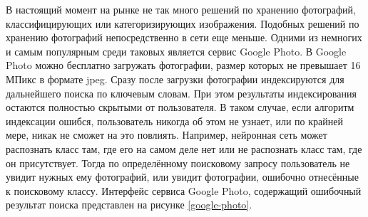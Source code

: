 В настоящий момент на рынке не так много решений по хранению фотографий, классифицирующих или категоризирующих изображения.
Подобных решений по хранению фотографий непосредственно в сети еще меньше.
Одними из немногих и самым популярным среди таковых является сервис Google Photo. 
В Google Photo можно бесплатно загружать фотографии, размер которых не превышает 16 МПикс в формате jpeg. 
Сразу после загрузки фотографии индексируются для дальнейшего поиска по ключевым словам.
При этом результаты индексирования остаются полностью скрытыми от пользователя. 
В таком случае, если алгоритм индексации ошибся, пользователь никогда об этом не узнает, или по крайней мере, никак не сможет на это повлиять. 
Например, нейронная сеть может распознать класс там, где его на самом деле нет или не распознать класс там, где он присутствует.
Тогда по определённому поисковому запросу пользователь не увидит нужных ему фотографий, или увидит фотографии, ошибочно отнесённые к поисковому классу.
Интерфейс сервиса Google Photo, содержащий ошибочный результат поиска представлен на рисунке \ref{google-photo}.


